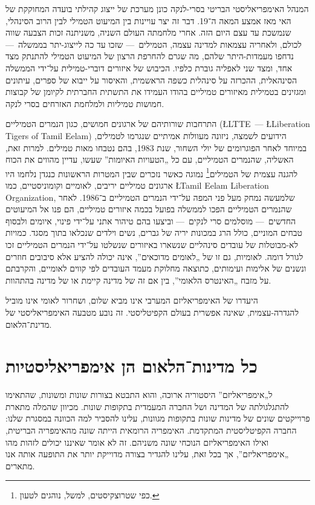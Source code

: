 המנהל האימפריאליסטי הבריטי בסרי-לנקה כונן מערכת של ייצוג קהילתי בועדה המחוקקת של האי מאז אמצע המאה ה־19. דבר זה יצר עויינות בין המיעוט הטמילי לבין הרוב הסינהלי, שנמשכת עד עצם היום הזה. אחרי מלחמתה העולם השניה, משניתנה זכות הצבעה שווה לכולם, ולאחריה עצמאות למדינה עצמה, הטמילים~— שזכו עד כה לייצוג-יתר בממשלה~— נדחפו מעמדות-היתר שלהם, מה שגרם להחרפת הרצון של המיעוט הטמילי להתנתק מצד אחד, ומצד שני לאפליה גוברת כלפיו. הכיבוש של איזורים דוברי-טמילית על־ידי הממשלה הסינהאלית, ההכרזה על סינהלית כשפה הראשמית, והאיסור על ייבוא של ספרים, עיתונים ומגזינים בטמילית מאיזורים טמיליים בהודו העמידו את התשתית החברתית לקיומן של קבוצות חמושות טמיליות ולמלחמת האזרחים בסרי לנקה.

התרחבות שורותיהם של ארגונים חמושים, כגון הנמרים הטמיליים (\L{LTTE}~— \L{Liberation Tigers of Tamil Eelam}) הידועים לשמצה, ניזונה מעוולות אמיתיים שנגרמו לטמילים, במיוחד לאחר הפוגרומים של יולי השחור, שנת 1983, בהם נטבחו מאות טמילים. למרות זאת, האשליה, שהנמרים הטמיליים, עם כל „הטעויות האיומות” שעשו, עדיין מהווים את הכוח להגנה עצמית של הטמילים\footnote{כפי שטרוצקיסטים, למשל, נוהגים לטעון.} נמוגה כאשר נזכרים שבין המטרות הראשונות כנגדן נלחמו היו ארגונים טמיליים יריבים, לאומיים וקומוניסטיים, כמו \L{Tamil Eelam Liberation Organization}, שלמעשה נמחק מעל פני המפה על־ידי הנמרים הטמיליים ב־1986. לאחר שהנמרים הטמיליים הפכו לממשלה בפועל בכמה איזורים טמיליים, הם פנו אל המיעוטים החדשים~— מוסלמים סרי לנקים~— וביצעו בהם טיהור אתני על־ידי פינוי, איומים ולבסוף טבחים המוניים, כולל הרג במכונות יריה של גברים, נשים וילדים שנכלאו בתוך מסגד. כמויות לא-מבוטלות של עובדים סינהליים שנשארו באיזורים שנשלטו על־ידי הנמרים הטמיליים זכו לגורל דומה. לאומיות, גם זו של „לאומים מדוכאים”, אינה יכולה להציע אלא סיבובים חוזרים ונשנים של אלימות ועימותים, כתוצאה מחלוקת מעמד העובדים לפי קווים לאומיים, והקרבתם על מזבח „האינטרס הלאומי”, בין אם זה של מדינה קיימת או של מדינה בהתהוות.

היעדרו של האימפריאליזם המערבי אינו מביא שלום, ושחרור לאומי אינו מוביל להגדרה-עצמית, שאינה אפשרית בעולם הקפיטליסטי. זה נובע מטבעה האימפריאליסטי של מדינת־הלאום.



\section*{כל מדינות־הלאום הן אימפריאליסטיות}

ל„אימפריאליזם” היסטוריה ארוכה, והוא התבטא בצורות שונות ומשונות, שהתאימו להתגלגולתה של המדינה ושל החברה המעמדית בתקופות שונות. מכיוון שהמלה מתארת פרוייקטים שונים של מדינות שונות בתקופות מגוונות, עלינו להסביר למה הכוונה במסגרת שלנו: החברה הקפיטליסטית המתקדמת. האימפריה הרומאית הייתה שונה מהאימפריה הבריטית, ואילו האימפריאליזם הנוכחי שונה משניהם. זה לא אומר שאיננו יכולים לזהות מהו „אימפריאליזם”, אך בכל זאת, עלינו להגדיר בצורה מדוייקת יותר את התופעה אותה אנו מתארים.

